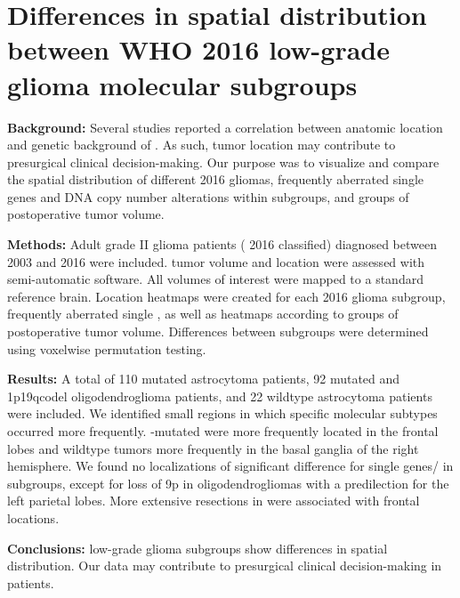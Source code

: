 
\chapter[Differences in spatial distribution between WHO 2016 low-grade glioma molecular subgroups][WHO 2016 subgroup localization]{Differences in spatial distribution between WHO 2016 low-grade glioma molecular subgroups}\label{chap:LGGLocation}



\begin{ChapterAbstract}
    \textbf{Background:} Several studies reported a correlation between anatomic location and genetic background of .
    As such, \gls{tumor} location may contribute to presurgical clinical decision-making.
    Our purpose was to visualize and compare the spatial distribution of different  2016 gliomas, frequently aberrated single genes and DNA copy number alterations within subgroups, and groups of postoperative \gls{tumor} volume.

    \textbf{Methods:}
    Adult grade II glioma patients ( 2016 classified) diagnosed between 2003 and 2016 were included.
    \Gls{tumor} volume and location were assessed with semi-automatic software.
    All volumes of interest were mapped to a standard reference brain.
    Location heatmaps were created for each  2016 glioma subgroup, frequently aberrated single , as well as heatmaps according to groups of postoperative \gls{tumor} volume.
    Differences between subgroups were determined using voxelwise permutation testing.

    \textbf{Results:}
    A total of 110  mutated astrocytoma patients, 92  mutated and \acl{1p19qcodel} oligodendroglioma patients, and 22  wildtype astrocytoma patients were included.
    We identified small regions in which specific molecular subtypes occurred more frequently.
    -mutated  were more frequently located in the frontal lobes and  wildtype \glspl{tumor} more frequently in the basal ganglia of the right hemisphere.
    We found no localizations of significant difference for single genes/ in subgroups, except for loss of 9p in oligodendrogliomas with a predilection for the left parietal lobes.
    More extensive resections in  were associated with frontal locations.

    \textbf{Conclusions:}
     low-grade glioma subgroups show differences in spatial distribution.
    Our data may contribute to presurgical clinical decision-making in  patients.

\end{ChapterAbstract}

